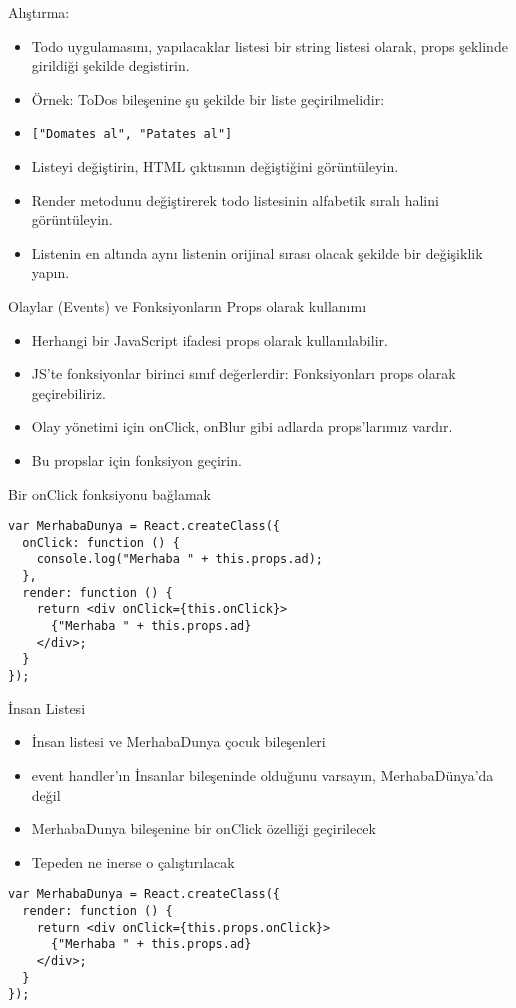 \documentclass[presentation]{beamer}
\begin{document}
\begin{frame}[fragile,label=sec-7]{Alıştırma:}
 \begin{itemize}
\item Todo uygulamasını, yapılacaklar listesi bir string listesi olarak, props
şeklinde girildiği şekilde degistirin.
\item Örnek: ToDos bileşenine şu şekilde bir liste geçirilmelidir:
\item \texttt{["Domates al", "Patates al"]}
\item Listeyi değiştirin, HTML çıktısının değiştiğini görüntüleyin.
\item Render metodunu değiştirerek todo listesinin alfabetik sıralı halini görüntüleyin.
\item Listenin en altında aynı listenin orijinal sırası olacak şekilde bir
değişiklik yapın.
\end{itemize}
\end{frame}


\begin{frame}[label=sec-8]{Olaylar (Events) ve Fonksiyonların Props olarak kullanımı}
\begin{itemize}
\item Herhangi bir JavaScript ifadesi props olarak kullanılabilir.
\item JS'te fonksiyonlar birinci sınıf değerlerdir: Fonksiyonları props olarak
geçirebiliriz.
\item Olay yönetimi için onClick, onBlur gibi adlarda props'larımız vardır.
\item Bu propslar için fonksiyon geçirin.
\end{itemize}
\end{frame}

\begin{frame}[fragile,label=sec-9]{Bir onClick fonksiyonu bağlamak}
 \begin{verbatim}
var MerhabaDunya = React.createClass({
  onClick: function () {
    console.log("Merhaba " + this.props.ad);
  },
  render: function () {
    return <div onClick={this.onClick}>
      {"Merhaba " + this.props.ad}
    </div>;
  }
});
\end{verbatim}
\end{frame}

\begin{frame}[fragile,label=sec-10]{İnsan Listesi}
 \begin{itemize}
\item İnsan listesi ve MerhabaDunya çocuk bileşenleri
\item event handler'ın İnsanlar bileşeninde olduğunu varsayın, MerhabaDünya'da değil
\item MerhabaDunya bileşenine bir onClick özelliği geçirilecek
\item Tepeden ne inerse o çalıştırılacak
\end{itemize}

\begin{verbatim}
var MerhabaDunya = React.createClass({
  render: function () {
    return <div onClick={this.props.onClick}>
      {"Merhaba " + this.props.ad}
    </div>;
  }
});
\end{verbatim}
\end{frame}
\end{document}
